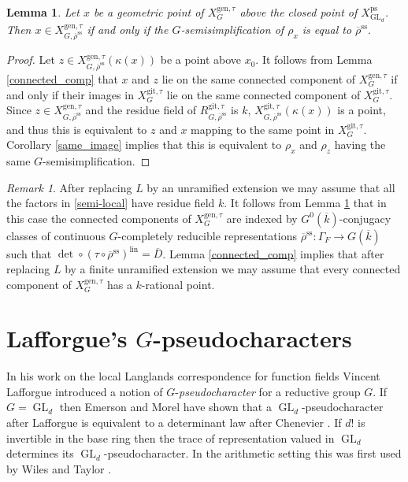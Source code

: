 \documentclass{amsart}
\newtheorem{lem}[prop]{Lemma}
\theoremstyle{definition}
\theoremstyle{remark}
\newtheorem{remar}[prop]{Remark}
\DeclareMathOperator{\GL}{GL}
\newcommand{\rhobar}{\overline{\rho}}
\newcommand{\ps}{\mathrm{ps}}
\newcommand{\gen}{\mathrm{gen}}
\newcommand{\gps}{\mathrm{git}}
\newcommand{\Dbar}{\overline{D}}
\newcommand{\lin}{\mathrm{lin}}
\newcommand{\XpsGLd}{X^{\ps}_{\GL_d}}
\newcommand{\XgenGtau}{X^{\gen, \tau}_G}
\newcommand{\XgpsGtau}{X^{\gps, \tau}_{G}}
\newcommand{\kbar}{\overline{k}}
\newcommand{\rhobarss}{\rhobar^{\mathrm{ss}}}
\begin{document}
\begin{lem}\label{get_comp} Let $x$ be a geometric point of $\XgenGtau$ above the closed point 
of $\XpsGLd$. Then $x\in X^{\gen, \tau}_{G, \rhobarss}$ if and only if 
the $G$-semisimplification of $\rho_x$ is equal to $\rhobarss$.
\end{lem}
\begin{proof} Let $z\in X^{\gen, \tau}_{G, \rhobarss}(\kappa(x))$ be a point above $x_0$. 
It follows from Lemma \ref{connected_comp} that $x$ and $z$ lie on the same connected 
component of $X^{\gen, \tau}_G$ if and only if their images in $X^{\gps, \tau}_G$ lie on the 
same connected component of $X^{\gps, \tau}_G$. Since $z\in X^{\gen, \tau}_{G, \rhobarss}$ 
and the residue field of $R^{\gps, \tau}_{G, \rhobarss}$ is $k$, $X^{\gps, \tau}_{G, \rhobarss}(\kappa(x))$
is a point, and thus this is equivalent to $z$ and $x$ mapping to the same point  in 
$\XgpsGtau$. Corollary \ref{same_image} implies that this is equivalent 
to $\rho_x$ and $\rho_z$ having  the same $G$-semi\-simpli\-fi\-cation.
\end{proof}

\begin{remar}\label{rem_k_rat_comp}
After replacing $L$ by an unramified extension we may assume that all the
factors in \eqref{semi-local} have residue field $k$. It follows from Lemma \ref{get_comp} 
that in this case the connected components of $X^{\gen, \tau}_G$ are indexed 
by $G^0(\kbar)$-conjugacy classes of continuous $G$-completely reducible representations
$\rhobarss: \Gamma_F \rightarrow G(\kbar)$ such that $\det\circ (\tau\circ \rhobarss)^{\lin}=\Dbar$. Lemma \ref{connected_comp} implies that after replacing $L$ 
by a finite unramified extension we may assume that every connected component of 
$X^{\gen, \tau}_G$ has a $k$-rational point.
\end{remar}



\section{\texorpdfstring{Lafforgue's $G$-pseudocharacters}{Lafforgue's G-pseudocharacters}}\label{Laf}

In his work on the local Langlands correspondence for function fields \cite{Laf} Vincent Lafforgue introduced a notion of $G$-\emph{pseudocharacter} for a reductive group $G$.
If $G=\GL_d$ then Emerson and Morel \cite{emerson2023comparison} have shown that a 
$\GL_d$-pseudocharacter after Lafforgue is equivalent to a determinant law after Chenevier \cite{che_durham}. If $d!$ is invertible in the base ring then the trace 
of representation valued in $\GL_d$ determines its $\GL_d$-pseudocharacter. In the arithmetic 
setting this was first used  by Wiles \cite{Wiles1988} and Taylor \cite{Tay91}. 
\end{document}
